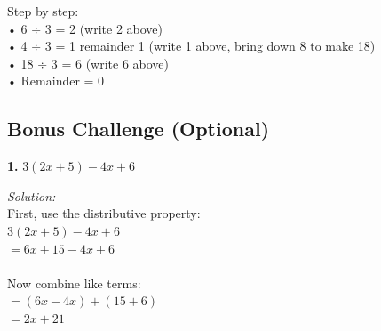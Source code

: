 \documentclass[12pt]{article}
\begin{document}
                Step by step:\\
                • 6 ÷ 3 = 2 (write 2 above)\\
                • 4 ÷ 3 = 1 remainder 1 (write 1 above, bring down 8 to make 18)\\
                • 18 ÷ 3 = 6 (write 6 above)\\
                • Remainder = 0


                \newpage

        \subsection*{Bonus Challenge (Optional)}

            \textbf{1.} $3(2x + 5) - 4x + 6$

                \textit{Solution:}\\
                First, use the distributive property:\\
                $3(2x + 5) - 4x + 6$\\
                $= 6x + 15 - 4x + 6$\\
                \\
                Now combine like terms:\\
                $= (6x - 4x) + (15 + 6)$\\
                $= 2x + 21$

\end{document}
